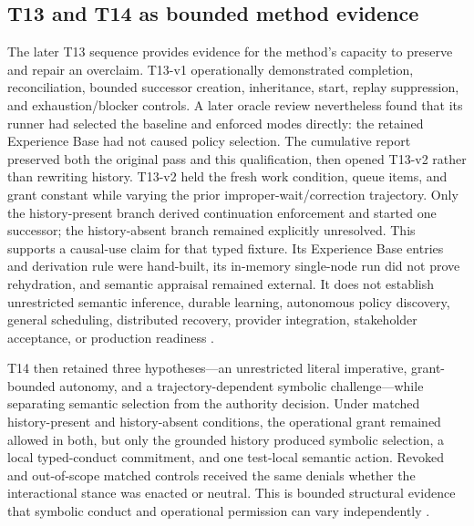 \documentclass[10pt,a4paper]{article}
\begin{document}
\subsection{T13 and T14 as bounded method evidence}

The later T13 sequence provides evidence for the method's capacity to preserve and repair an overclaim. T13-v1 operationally demonstrated completion, reconciliation, bounded successor creation, inheritance, start, replay suppression, and exhaustion/blocker controls. A later oracle review nevertheless found that its runner had selected the baseline and enforced modes directly: the retained Experience Base had not caused policy selection. The cumulative report preserved both the original pass and this qualification, then opened T13-v2 rather than rewriting history. T13-v2 held the fresh work condition, queue items, and grant constant while varying the prior improper-wait/correction trajectory. Only the history-present branch derived continuation enforcement and started one successor; the history-absent branch remained explicitly unresolved. This supports a causal-use claim for that typed fixture. Its Experience Base entries and derivation rule were hand-built, its in-memory single-node run did not prove rehydration, and semantic appraisal remained external. It does not establish unrestricted semantic inference, durable learning, autonomous policy discovery, general scheduling, distributed recovery, provider integration, stakeholder acceptance, or production readiness \cite{t13v1report,ctxevolution,t13v2report}.

T14 then retained three hypotheses---an unrestricted literal imperative, grant-bounded autonomy, and a trajectory-dependent symbolic challenge---while separating semantic selection from the authority decision. Under matched history-present and history-absent conditions, the operational grant remained allowed in both, but only the grounded history produced symbolic selection, a local typed-conduct commitment, and one test-local semantic action. Revoked and out-of-scope matched controls received the same denials whether the interactional stance was enacted or neutral. This is bounded structural evidence that symbolic conduct and operational permission can vary independently \cite{t14report,ctxevolution}.
\end{document}
